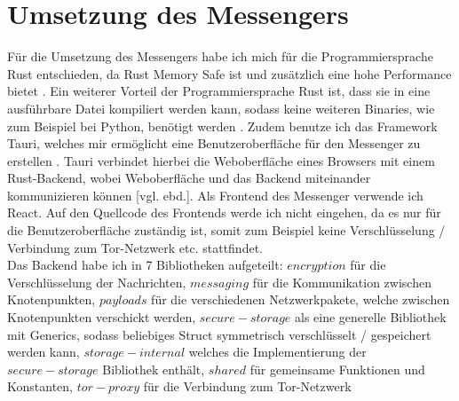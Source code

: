 \documentclass[a4paper,ngerman, headheight=28pt,12pt]{scrartcl}
\newcommand{\vcite}[1]{\cite[vgl.][]{#1}}
\newcommand{\vebd}{[vgl. ebd.]}
\begin{document}
\section{Umsetzung des Messengers}
Für die Umsetzung des Messengers habe ich mich für die Programmiersprache Rust entschieden, da Rust Memory Safe ist und zusätzlich eine hohe Performance bietet \vcite{RustSecurity}. Ein weiterer Vorteil der Programmiersprache Rust ist, dass sie in eine ausführbare Datei kompiliert werden kann, sodass keine weiteren Binaries, wie zum Beispiel bei Python, benötigt werden \vcite{RustCompile}. Zudem benutze ich das Framework Tauri, welches mir ermöglicht eine Benutzeroberfläche für den Messenger zu erstellen \vcite{RustTauri}. Tauri verbindet hierbei die Weboberfläche eines Browsers mit einem Rust-Backend, wobei Weboberfläche und das Backend miteinander kommunizieren können \vebd. Als Frontend des Messenger verwende ich React. Auf den Quellcode des Frontends werde ich nicht eingehen, da es nur für die Benutzeroberfläche zuständig ist, somit zum Beispiel keine Verschlüsselung / Verbindung zum Tor-Netzwerk etc. stattfindet. \\
Das Backend habe ich in 7 Bibliotheken aufgeteilt: $encryption$ für die Verschlüsselung der Nachrichten, $messaging$ für die Kommunikation zwischen Knotenpunkten, $payloads$ für die verschiedenen Netzwerkpakete, welche zwischen Knotenpunkten verschickt werden, $secure-storage$ als eine generelle Bibliothek mit Generics, sodass beliebiges Struct symmetrisch verschlüsselt / gespeichert werden kann, $storage-internal$ welches die Implementierung der $secure-storage$ Bibliothek enthält, $shared$ für gemeinsame Funktionen und Konstanten, $tor-proxy$ für die Verbindung zum Tor-Netzwerk
\end{document}
